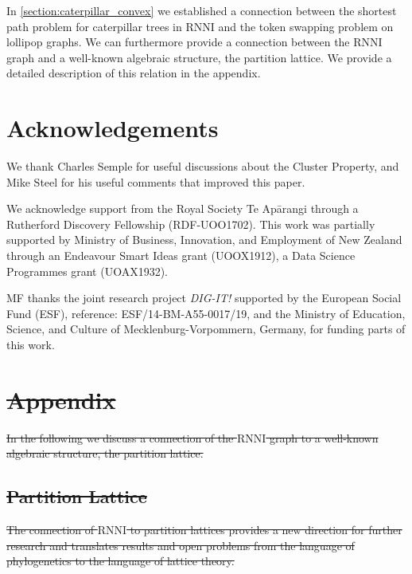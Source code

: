 \documentclass[11pt]{amsart}
\newcommand{\rnni}{\mathrm{RNNI}}
\newcommand{\summary}[1]{} %
\providecommand{\DIFdeltex}[1]{{\protect\color{red}\sout{#1}}}                      %
\providecommand{\DIFdelbegin}{} %
\providecommand{\DIFdel}[1]{\texorpdfstring{\DIFdeltex{#1}}{}} %
\newcommand{\DIFscaledelfig}{0.5}
\newlength{\DIFdelgraphicswidth} %
\newlength{\DIFdelgraphicsheight} %
\newcommand{\DIFdelincludegraphics}[2][]{%
\sbox{\DIFdelgraphicsbox}{\DIFOincludegraphics[#1]{#2}}%
\settoboxwidth{\DIFdelgraphicswidth}{\DIFdelgraphicsbox} %
\settoboxtotalheight{\DIFdelgraphicsheight}{\DIFdelgraphicsbox} %
\scalebox{\DIFscaledelfig}{%
\parbox[b]{\DIFdelgraphicswidth}{\usebox{\DIFdelgraphicsbox}\\[-\baselineskip] \rule{\DIFdelgraphicswidth}{0em}}\llap{\resizebox{\DIFdelgraphicswidth}{\DIFdelgraphicsheight}{%
\setlength{\unitlength}{\DIFdelgraphicswidth}%
\begin{picture}(1,1)%
\thicklines\linethickness{2pt} %
{\color[rgb]{1,0,0}\put(0,0){\framebox(1,1){}}}%
{\color[rgb]{1,0,0}\put(0,0){\line( 1,1){1}}}%
{\color[rgb]{1,0,0}\put(0,1){\line(1,-1){1}}}%
\end{picture}%
}\hspace*{3pt}}} %
} %
\DeclareRobustCommand{\DIFdelbegin}{\DIFOdelbegin \let\includegraphics\DIFdelincludegraphics} %
\begin{document}
\summary{partition lattice -- can be found in appendix}
In \autoref{section:caterpillar_convex} we established a connection between the shortest path problem for caterpillar trees in $\rnni$ and the token swapping problem on lollipop graphs.
We can furthermore provide a connection between the $\rnni$ graph and a well-known algebraic structure, the partition lattice.
We provide a detailed description of this relation in the appendix.


\section*{Acknowledgements}
We thank Charles Semple for useful discussions about the Cluster Property, and Mike Steel for his useful comments that improved this paper.

We acknowledge support from the Royal Society Te Ap\=arangi through a Rutherford Discovery Fellowship (RDF-UOO1702).
This work was partially supported by Ministry of Business, Innovation, and Employment of New Zealand through an Endeavour Smart Ideas grant (UOOX1912), a Data Science Programmes grant (UOAX1932).

MF thanks the joint research project \textit{DIG-IT!} supported by the European Social Fund (ESF), reference: ESF/14-BM-A55-0017/19, and the Ministry of Education, Science, and Culture of Mecklenburg-Vorpommern, Germany, for funding parts of this work.

\printbibliography
 \DIFdelbegin %

\section{\DIFdel{Appendix}}
\addtocounter{section}{-1}%

\DIFdel{In the following we discuss a connection of the $\rnni$ graph to a well-known algebraic structure, the partition lattice.
}%

\subsection{\DIFdel{Partition Lattice}}
\addtocounter{subsection}{-1}%
\DIFdel{The connection of $\rnni$ to partition lattices provides a new direction for further research and translates results and open problems from the language of phylogenetics to the language of lattice theory.
}%
\end{document}
